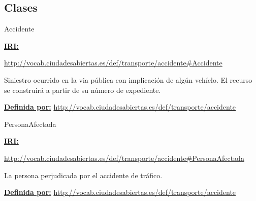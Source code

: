 \subsection{Clases}



\begin{mybox}{Accidente}
\begin{flushleft}
\underline{\textbf{IRI:}}

\url{http://vocab.ciudadesabiertas.es/def/transporte/accidente#Accidente}
\newline

Siniestro ocurrido en la via pública con implicación de algún vehíclo. El recurso se construirá a partir de su número de expediente.
\newline

\underline{\textbf{Definida por:}}\newline
\url{http://vocab.ciudadesabiertas.es/def/transporte/accidente}
\newline




\end{flushleft}
\end{mybox}


\begin{mybox}{PersonaAfectada}
\begin{flushleft}
\underline{\textbf{IRI:}}

\url{http://vocab.ciudadesabiertas.es/def/transporte/accidente#PersonaAfectada}
\newline

La persona perjudicada por el accidente de tráfico.
\newline

\underline{\textbf{Definida por:}}
\newline
\url{http://vocab.ciudadesabiertas.es/def/transporte/accidente}
\newline

\end{flushleft}
\end{mybox}


